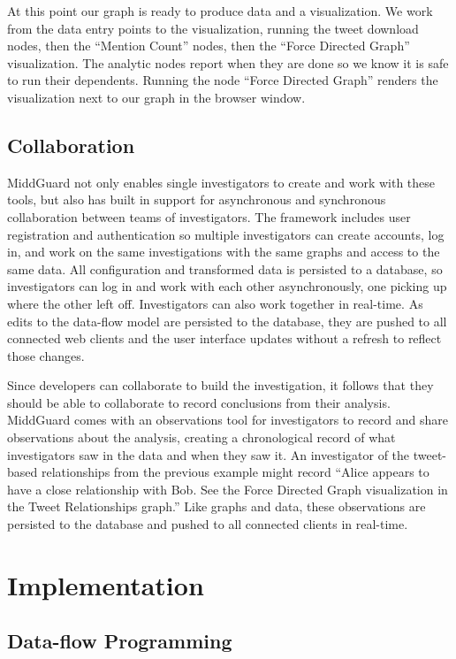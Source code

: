 \documentclass[midd]{thesis}
\begin{document}
At this point our graph is ready to produce data and a visualization. We work
from the data entry points to the visualization, running the tweet download
nodes, then the ``Mention Count'' nodes, then the ``Force Directed Graph''
visualization. The analytic nodes report when they are done so we know it is
safe to run their dependents. Running the node ``Force Directed Graph'' renders
the visualization next to our graph in the browser window.

\section{Collaboration}

MiddGuard not only enables single investigators to create and work with these
tools, but also has built in support for asynchronous and synchronous
collaboration between teams of investigators. The framework includes user
registration and authentication so multiple investigators can create accounts,
log in, and work on the same investigations with the same graphs and access to
the same data. All configuration and transformed data is persisted to a
database, so investigators can log in and work with each other asynchronously,
one picking up where the other left off. Investigators can also work together in
real-time. As edits to the data-flow model are persisted to the database, they
are pushed to all connected web clients and the user interface updates without a
refresh to reflect those changes.

Since developers can collaborate to build the investigation, it follows that
they should be able to collaborate to record conclusions from their analysis.
MiddGuard comes with an observations tool for investigators to record and share
observations about the analysis, creating a chronological record of what
investigators saw in the data and when they saw it. An investigator of the
tweet-based relationships from the previous example might record ``Alice appears
to have a close relationship with Bob. See the Force Directed Graph
visualization in the Tweet Relationships graph.'' Like graphs and data, these
observations are persisted to the database and pushed to all connected clients
in real-time.

\chapter{Implementation}

\section{Data-flow Programming}
\end{document}
